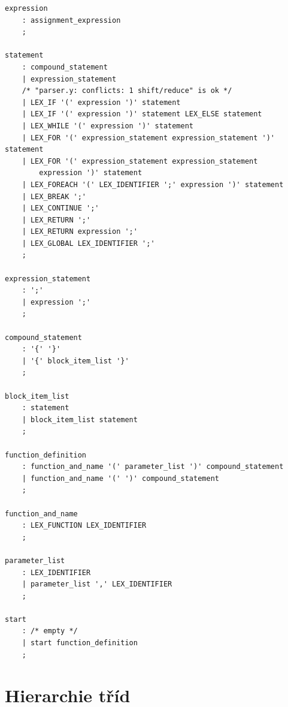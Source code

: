\documentclass[11pt,twoside,a4paper]{book}
\begin{document}
\begin{verbatim}
expression
    : assignment_expression
    ;

statement
    : compound_statement
    | expression_statement
    /* "parser.y: conflicts: 1 shift/reduce" is ok */
    | LEX_IF '(' expression ')' statement
    | LEX_IF '(' expression ')' statement LEX_ELSE statement
    | LEX_WHILE '(' expression ')' statement
    | LEX_FOR '(' expression_statement expression_statement ')' statement
    | LEX_FOR '(' expression_statement expression_statement
        expression ')' statement
    | LEX_FOREACH '(' LEX_IDENTIFIER ';' expression ')' statement
    | LEX_BREAK ';'
    | LEX_CONTINUE ';'
    | LEX_RETURN ';'
    | LEX_RETURN expression ';'
    | LEX_GLOBAL LEX_IDENTIFIER ';'
    ;

expression_statement
    : ';'
    | expression ';'
    ;

compound_statement
    : '{' '}'
    | '{' block_item_list '}'
    ;

block_item_list
    : statement
    | block_item_list statement
    ;

function_definition
    : function_and_name '(' parameter_list ')' compound_statement
    | function_and_name '(' ')' compound_statement
    ;

function_and_name
    : LEX_FUNCTION LEX_IDENTIFIER
    ;

parameter_list
    : LEX_IDENTIFIER
    | parameter_list ',' LEX_IDENTIFIER
    ;

start
    : /* empty */
    | start function_definition
    ;
\end{verbatim}



\twocolumn

\chapter{Hierarchie tříd}
\end{document}
